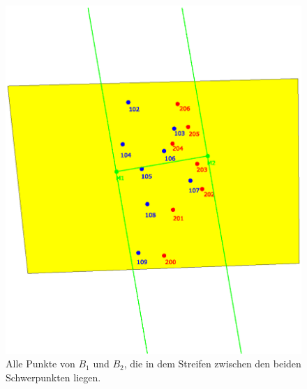 \begin{figure}
	\centering
	\includegraphics[scale=0.6]{RectDist.eps}
	\caption{Alle Punkte von $B_1$ und $B_2$, die in dem Streifen zwischen den beiden Schwerpunkten liegen.}
	\label{fig:RectDist}		
\end{figure}

